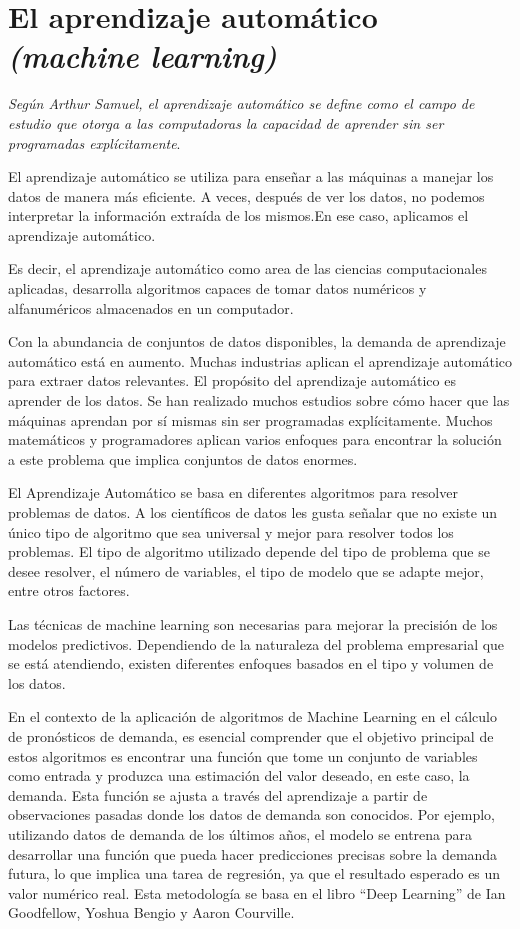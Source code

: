 \section{El aprendizaje automático \textit{(machine learning)}}

\textit{Según Arthur Samuel, el aprendizaje automático se define como el campo de estudio que otorga a las computadoras la capacidad de aprender sin ser programadas explícitamente}\cite{mahesh2020machine}. 

El aprendizaje automático se utiliza para enseñar a las máquinas a manejar los datos de manera más eficiente. A veces, después de ver los datos, no podemos interpretar la información extraída de los mismos.En ese caso, aplicamos el aprendizaje automático.

Es decir, el aprendizaje automático como area de las ciencias computacionales aplicadas, desarrolla algoritmos capaces de tomar datos numéricos y alfanuméricos almacenados en un computador\cite{herrera2020prediccion}. 

Con la abundancia de conjuntos de datos disponibles, la demanda de aprendizaje automático está en aumento. Muchas industrias aplican el aprendizaje automático para extraer datos relevantes. El propósito del aprendizaje automático es aprender de los datos. Se han realizado muchos estudios sobre cómo hacer que las máquinas aprendan por sí mismas sin ser programadas explícitamente. Muchos matemáticos y programadores aplican varios enfoques para encontrar la solución a este problema que implica conjuntos de datos enormes\cite{mahesh2020machine}.

\vspace{1\baselineskip}
El Aprendizaje Automático se basa en diferentes algoritmos para resolver problemas de datos. A los científicos de datos les gusta señalar que no existe un único tipo de algoritmo que sea universal y mejor para resolver todos los problemas. El tipo de algoritmo utilizado depende del tipo de problema que se desee resolver, el número de variables, el tipo de modelo que se adapte mejor, entre otros factores. 

Las técnicas de machine learning son necesarias para mejorar la precisión de los modelos predictivos. Dependiendo de la naturaleza del problema empresarial que se está atendiendo, existen diferentes enfoques basados en el tipo y volumen de los datos\cite{ibm}.

En el contexto de la aplicación de algoritmos de Machine Learning en el cálculo de pronósticos de demanda, es esencial comprender que el objetivo principal de estos algoritmos es encontrar una función que tome un conjunto de variables como entrada y produzca una estimación del valor deseado, en este caso, la demanda. Esta función se ajusta a través del aprendizaje a partir de observaciones pasadas donde los datos de demanda son conocidos. Por ejemplo, utilizando datos de demanda de los últimos años, el modelo se entrena para desarrollar una función que pueda hacer predicciones precisas sobre la demanda futura, lo que implica una tarea de regresión, ya que el resultado esperado es un valor numérico real. Esta metodología se basa en el libro “Deep Learning” de Ian Goodfellow, Yoshua Bengio y Aaron Courville\cite{goodfellow2016deep}.

